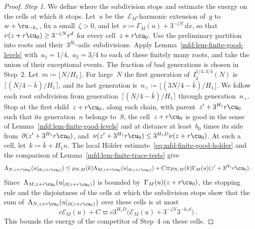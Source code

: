 \documentclass[11pt]{amsart}
\begin{document}
\begin{proof}
\emph{Step 1.} We define where the subdivision stops and estimate the energy on the cells at which it stops. Let~$u$ be the~$\mathscr E_M$-harmonic extension of~$g$ to~$w+\cu_{-k_*}$, fix a small~$\zeta>0$, and let~$\nu\coloneqq\Gamma_M(u)+3^{-\zeta N}\,dx$, so that~$\nu(z+r\cu_0)\geq3^{-\zeta N}r^d$ for every cell~$z+r\cu_0$. Use the preliminary partition into roots and their~$3^{H_1}$-adic subdivisions. Apply Lemma~\ref{mfd:lem-finite-good-levels} with~$a_1=1/4$,~$a_2=3/4$ to each of these finitely many roots, and take the union of their exceptional events. The fraction of bad generations is chosen in Step~2. Let~$m\coloneqq\lfloor N/H_1\rfloor$. For large~$N$ the first generation of~$I_{\bar k}^{1/4,3/4}(N)$ is~$\lceil(N/4-\bar k)/H_1\rceil$, and its last generation is~$n_+\coloneqq\lfloor(3N/4-\bar k)/H_1\rfloor$. We follow each root subdivision from generation~$\lceil(N/4-\bar k)/H_1\rceil$ through generation~$n_+$. Stop at the first child~$z+r\cu_0$, along each chain, with parent~$z'+3^{H_1}r\cu_0$ such that its generation~$n$ belongs to~$S$, the cell~$z+r\cu_0$ is good in the sense of Lemma~\ref{mfd:lem-finite-good-levels} and at distance at least~$b_0$ times its side from~$\partial(z'+3^{H_1}r\cu_0)$, and~$\nu(z'+3^{H_1}r\cu_0)\leq3^{H_1D}\nu(z+r\cu_0)$. At such a cell, let~$k\coloneqq\bar k+H_1n$. The local H\"older estimate~\eqref{eq:mfd-finite-good-holder} and the comparison of Lemma~\ref{mfd:lem-finite-trace-tests} give
\begin{equation*}
	\Lambda_{N,z+r\cu_0}(u|_{\partial(z+r\cu_0)})
	\leq \rho_{N,M}(k)\Lambda_{M,z+r\cu_0}(u|_{\partial(z+r\cu_0)})
	+C\varpi \rho_{N,M}(k)\Gamma_M(u)(z'+3^{H_1}r\cu_0)\,.
\end{equation*}
Since~$\Lambda_{M,z+r\cu_0}(u|_{\partial(z+r\cu_0)})$ is bounded by~$\Gamma_M(u)(z+r\cu_0)$, the stopping rule and the disjointness of the cells at which the subdivision stops show that the sum of~$\Lambda_{N,z+r\cu_0}(u|_{\partial(z+r\cu_0)})$ over these cells is at most
\begin{equation*}
	c \mathscr E_M(u)+C\varpi c 3^{H_1D}
	\bigl(\mathscr E_M(u)+3^{-\zeta N}3^{-k_*d}\bigr)\,.
\end{equation*}
This bounds the energy of the competitor of Step~4 on these cells.

\smallskip


\end{proof}
\end{document}
